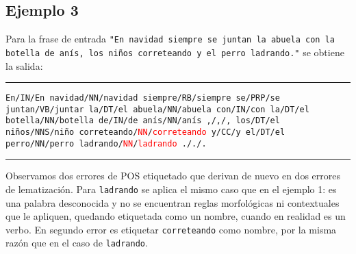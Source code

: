 \subsection*{Ejemplo 3}
Para la frase de entrada \texttt{"En navidad siempre se juntan la abuela con la botella de anís, los niños correteando y el perro ladrando."} se obtiene la salida: \newline
\noindent\rule{14cm}{0.4pt}\newline
\texttt{En/IN/En\newline
navidad/NN/navidad\newline
siempre/RB/siempre\newline
se/PRP/se\newline
juntan/VB/juntar\newline
la/DT/el\newline
abuela/NN/abuela\newline
con/IN/con\newline
la/DT/el\newline
botella/NN/botella\newline
de/IN/de\newline
anís/NN/anís\newline
,/,/,\newline
los/DT/el\newline
niños/NNS/niño\newline
correteando/\textcolor{red}{NN}/\textcolor{red}{correteando}\newline
y/CC/y\newline
el/DT/el\newline
perro/NN/perro\newline
ladrando/\textcolor{red}{NN}/\textcolor{red}{ladrando}\newline
././.\newline
}
\noindent\rule{14cm}{0.4pt}\newline
Observamos dos errores de POS etiquetado que derivan de nuevo en dos errores de lematización. Para \texttt{ladrando} se aplica el mismo caso que en el ejemplo 1: es una palabra desconocida y no se encuentran reglas morfológicas ni contextuales que le apliquen, quedando etiquetada como un nombre, cuando en realidad es un verbo.
En segundo error es etiquetar \texttt{correteando} como nombre, por la misma razón que en el caso de \texttt{ladrando}.